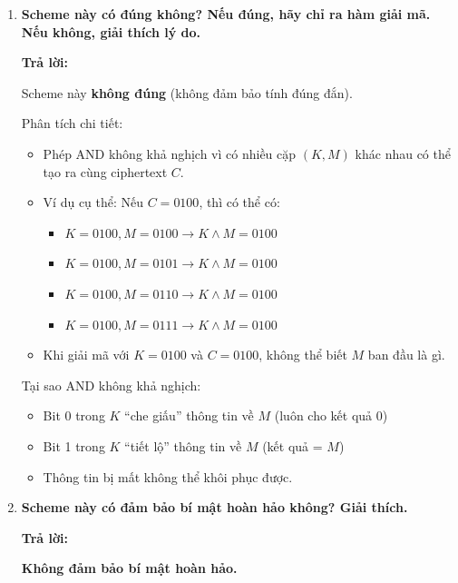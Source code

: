 \begin{enumerate}
    \item \textbf{Scheme này có đúng không? Nếu đúng, hãy chỉ ra hàm giải mã. Nếu không, giải thích lý do.}
    
    \begin{center}
    \textbf{Trả lời:}
    \end{center}
    
    Scheme này \textbf{không đúng} (không đảm bảo tính đúng đắn).
    
    Phân tích chi tiết:
    \begin{itemize}
        \item Phép AND không khả nghịch vì có nhiều cặp $(K, M)$ khác nhau có thể tạo ra cùng ciphertext $C$.
        \item Ví dụ cụ thể: Nếu $C = 0100$, thì có thể có:
        \begin{itemize}
            \item $K = 0100, M = 0100 \rightarrow K \land M = 0100$
            \item $K = 0100, M = 0101 \rightarrow K \land M = 0100$
            \item $K = 0100, M = 0110 \rightarrow K \land M = 0100$
            \item $K = 0100, M = 0111 \rightarrow K \land M = 0100$
        \end{itemize}
        \item Khi giải mã với $K = 0100$ và $C = 0100$, không thể biết $M$ ban đầu là gì.
    \end{itemize}
    
    Tại sao AND không khả nghịch:
    \begin{itemize}
        \item Bit 0 trong $K$ ``che giấu'' thông tin về $M$ (luôn cho kết quả 0)
        \item Bit 1 trong $K$ ``tiết lộ'' thông tin về $M$ (kết quả = $M$)
        \item Thông tin bị mất không thể khôi phục được.
    \end{itemize}
    
    \item \textbf{Scheme này có đảm bảo bí mật hoàn hảo không? Giải thích.}
    
    \begin{center}
    \textbf{Trả lời:}
    \end{center}
    
    \textbf{Không đảm bảo bí mật hoàn hảo.}
    

\end{enumerate}

